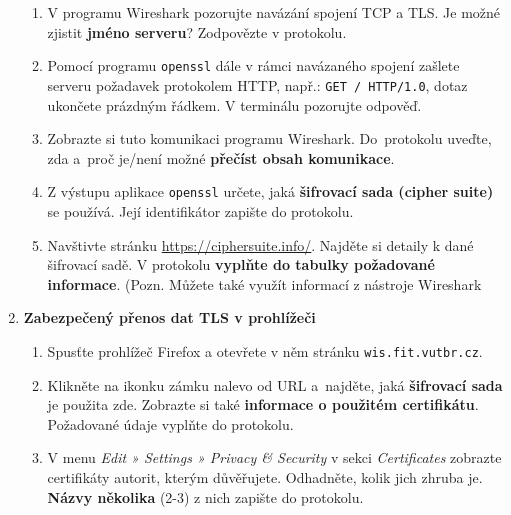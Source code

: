 \documentclass[a4paper,11pt]{article}
\begin{document}
\begin{enumerate}
\begin{enumerate}
      \item V programu Wireshark pozorujte navázání spojení TCP a TLS. Je možné zjistit \textbf{jméno serveru}?
      Zodpovězte v protokolu.

      \item Pomocí programu \texttt{openssl} dále v rámci navázaného spojení
        zašlete serveru požadavek protokolem HTTP, např.:
        \verb|GET / HTTP/1.0|, dotaz ukončete prázdným řádkem. V terminálu pozorujte
        odpověď.

      \item Zobrazte si tuto komunikaci programu Wireshark.
      Do~protokolu uveďte, zda a~proč je/není možné \textbf{přečíst obsah komunikace}.

      \item Z výstupu aplikace \texttt{openssl} určete, jaká \textbf{šifrovací sada (cipher suite)} se používá.
      Její identifikátor zapište do protokolu.

      \item Navštivte stránku \url{https://ciphersuite.info/}. Najděte si detaily k dané
      šifrovací sadě. V protokolu \textbf{vyplňte do tabulky požadované informace}.
      (Pozn. Můžete také využít informací z nástroje Wireshark

    \end{enumerate}

  \item {\bf Zabezpečený přenos dat TLS v prohlížeči}

    \begin{enumerate}


      \item Spusťte prohlížeč Firefox a otevřete v něm stránku
        \verb|wis.fit.vutbr.cz|.

      \item Klikněte na ikonku zámku nalevo od URL a~najděte, jaká \textbf{šifrovací
      sada} je použita zde. Zobrazte si také \textbf{informace o použitém certifikátu}.
      Požadované údaje vyplňte do protokolu.

      \item V menu \emph{Edit » Settings » Privacy \& Security} v sekci
        \emph{Certificates} zobrazte certifikáty autorit, kterým důvěřujete.
        Odhadněte, kolik jich zhruba je. \textbf{Názvy několika} (2-3) z nich zapište do protokolu.


\end{enumerate}
\end{enumerate}
\end{document}
